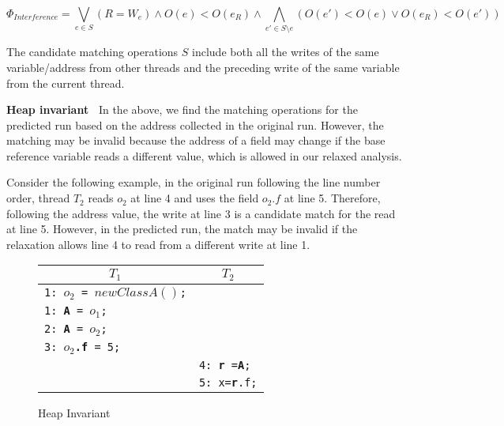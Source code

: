 $$
\Phi_{Interference}= \bigvee_{e\in S} (R=W_e) \wedge O(e)<O(e_R)
\wedge \bigwedge_{e'\in S\setminus e} (O(e')<O(e) \vee O(e_R)<O(e'))
$$


The candidate matching operations $S$ include both all the writes of the same variable/address from other threads and the preceding write of the same variable from the current thread. 


{\bf Heap invariant\ } In the above, we find the matching operations for the predicted run based on the address collected in the original run.
However, the matching may be invalid because the address of a field may change if the base reference variable reads a different value, which is allowed in our relaxed analysis. 

Consider the following example, in the original run following the line number order, thread $T_2$ reads $o_2$ at line 4 and uses the field $o_2.f$ at line 5. 
Therefore, following the address value, the write at line 3 is a candidate match for the read at line 5. However, in the predicted run, the match may be invalid if the relaxation allows line 4 to read from a different write at line 1.


\begin{figure}
\centering
\begin{tabular}{ll}
\hline
\multicolumn{1}{c}{$T_1$} & \multicolumn{1}{c}{$T_2$} \\
\hline
{\tt 1: {\bf $o_2$} = $new ClassA()$;} & \\
{\tt 1: {\bf A} = $o_1$;} & \\
{\tt 2: {\bf A} = $o_2$;} & \\
{\tt 3: {\bf $o_2$.f} = 5;} & \\
& {\tt 4: {\bf r} ={\bf A}; } \\
& {\tt 5: x={\bf r}.f;} \\	
\end{tabular}
\caption{Heap Invariant}
\label{fig:heapinv}
\end{figure}


